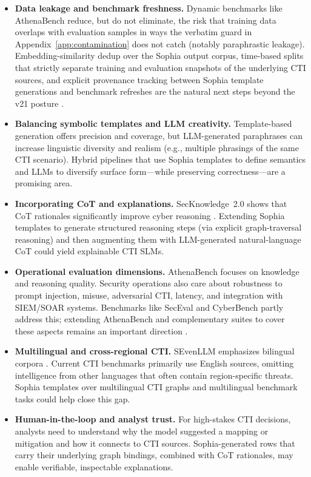 \documentclass[conference]{IEEEtran}
\begin{document}
\begin{itemize}
  \item \textbf{Data leakage and benchmark freshness.} Dynamic benchmarks like AthenaBench reduce, but do not eliminate, the risk that training data overlaps with evaluation samples in ways the verbatim guard in Appendix~\ref{app:contamination} does not catch (notably paraphrastic leakage). Embedding-similarity dedup over the Sophia output corpus, time-based splits that strictly separate training and evaluation snapshots of the underlying CTI sources, and explicit provenance tracking between Sophia template generations and benchmark refreshes are the natural next steps beyond the v21 posture \cite{alam2025athenabench,cardei2025ift}.
  \item \textbf{Balancing symbolic templates and LLM creativity.} Template-based generation offers precision and coverage, but LLM-generated paraphrases can increase linguistic diversity and realism (e.g., multiple phrasings of the same CTI scenario). Hybrid pipelines that use Sophia templates to define semantics and LLMs to diversify surface form---while preserving correctness---are a promising area.
  \item \textbf{Incorporating CoT and explanations.} SecKnowledge~2.0 shows that CoT rationales significantly improve cyber reasoning \cite{levi2025toward}. Extending Sophia templates to generate structured reasoning steps (via explicit graph-traversal reasoning) and then augmenting them with LLM-generated natural-language CoT could yield explainable CTI SLMs.
  \item \textbf{Operational evaluation dimensions.} AthenaBench focuses on knowledge and reasoning quality. Security operations also care about robustness to prompt injection, misuse, adversarial CTI, latency, and integration with SIEM/SOAR systems. Benchmarks like SecEval and CyberBench partly address this; extending AthenaBench and complementary suites to cover these aspects remains an important direction \cite{hu2024seceval,liu2024cyberbench,alam2025athenabench}.
  \item \textbf{Multilingual and cross-regional CTI.} SEvenLLM emphasizes bilingual corpora \cite{ji2024sevenllm}. Current CTI benchmarks primarily use English sources, omitting intelligence from other languages that often contain region-specific threats. Sophia templates over multilingual CTI graphs and multilingual benchmark tasks could help close this gap.
  \item \textbf{Human-in-the-loop and analyst trust.} For high-stakes CTI decisions, analysts need to understand why the model suggested a mapping or mitigation and how it connects to CTI sources. Sophia-generated rows that carry their underlying graph bindings, combined with CoT rationales, may enable verifiable, inspectable explanations.
\end{itemize}
\end{document}
